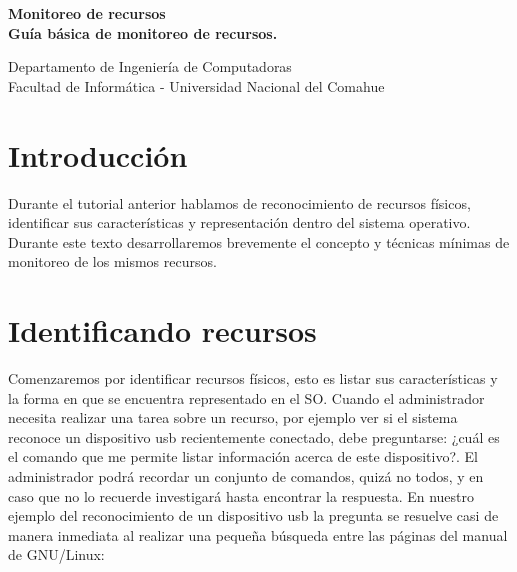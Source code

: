 \documentclass[12pt]{article}
\def\maketitle{

 \makeatletter
 {\color{bl} \centering \huge \sc \textbf{
 Monitoreo de recursos \\ 
\large \vspace*{-8pt} \color{black} Guía básica de monitoreo de recursos. 
 \vspace*{8pt} }\par}
 \makeatother


 \makeatletter
 {\centering \small 
 	Departamento de Ingeniería de Computadoras \\
 	Facultad de Informática - Universidad Nacional del Comahue \\
 	\vspace{20pt} }
 \makeatother

}
\begin{document}
\thispagestyle{empty}
\maketitle
\setlength{\parindent}{0pt}

\section*{Introducción}

Durante el tutorial anterior hablamos de reconocimiento de recursos físicos, identificar 
sus características y representación dentro del sistema operativo. Durante este 
texto desarrollaremos brevemente el concepto y técnicas mínimas de monitoreo de los mismos 
recursos. 


\section*{Identificando recursos}

Comenzaremos por identificar recursos físicos, esto es listar sus características y la forma en que 
se encuentra representado en el SO. Cuando el administrador necesita realizar una tarea
sobre un recurso, por ejemplo ver si el sistema reconoce un dispositivo usb recientemente conectado, 
debe preguntarse: ¿cuál es el comando que me permite listar información acerca de este dispositivo?. 
El administrador podrá recordar un conjunto de comandos, quizá no todos, y en caso que no lo recuerde
investigará hasta encontrar la respuesta. En nuestro ejemplo del reconocimiento de un dispositivo 
usb la pregunta se resuelve casi de manera inmediata al realizar una pequeña búsqueda entre las páginas
del manual de GNU/Linux: 
\end{document}
